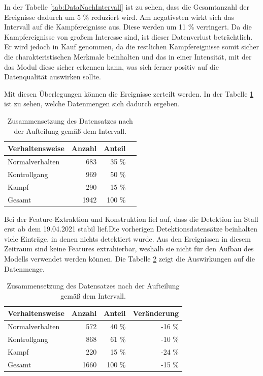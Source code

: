 In der Tabelle \ref{tab:DataNachIntervall} ist zu sehen, dass die Gesamtanzahl der Ereignisse dadurch um 5 \% reduziert wird. Am negativsten wirkt sich das Intervall auf die Kampfereignisse aus. Diese werden um 11 \% verringert. Da die Kampfereignisse von großem Interesse sind, ist dieser Datenverlust beträchtlich. Er wird jedoch in Kauf genommen, da die restlichen Kampfereignisse somit sicher die charakteristischen Merkmale beinhalten und das in einer Intensität, mit der das Modul diese sicher erkennen kann, was sich ferner positiv auf die Datenqualität auswirken sollte. \par

Mit diesen Überlegungen können die Ereignisse zerteilt werden. In der Tabelle \ref{tab:DatasetSplit} ist zu sehen, welche Datenmengen sich dadurch ergeben. 

\begin{table}[ht]
    \centering
    \caption{Zusammensetzung des Datensatzes nach der Aufteilung gemäß dem Intervall.}
    \begin{tabular}{|l|r|r|r|}
    \hline
        Verhaltensweise & Anzahl & Anteil \\
    \hline
        Normalverhalten & 683 & 35 \% \\
        Kontrollgang & 969 & 50 \% \\
        Kampf & 290 & 15 \% \\
    \hline
    \hline
        Gesamt & 1942 & 100 \%\\
    \hline
    \end{tabular}
    \label{tab:DatasetSplit}
\end{table}

Bei der Feature-Extraktion und Konstruktion fiel auf, dass die Detektion im Stall erst ab dem 19.04.2021 stabil lief.Die vorherigen Detektionsdatensätze beinhalten viele Einträge, in denen nichts detektiert wurde. Aus den Ereignissen in diesem Zeitraum sind keine Features extrahierbar, weshalb sie nicht für den Aufbau des Modells verwendet werden können. Die Tabelle \ref{tab:DatasetFeatExtr} zeigt die Auswirkungen auf die Datenmenge.

\begin{table}[ht]
    \centering
    \caption{Zusammensetzung des Datensatzes nach der Aufteilung gemäß dem Intervall.}
    \begin{tabular}{|l|r|r|r|}
    \hline
        Verhaltensweise & Anzahl & Anteil & Veränderung\\
    \hline
        Normalverhalten & 572 & 40 \% & -16 \%\\
        Kontrollgang & 868 & 61 \% & -10 \%\\
        Kampf & 220 & 15 \% & -24 \%\\
    \hline
    \hline
        Gesamt & 1660 & 100 \% & -15 \% \\
    \hline
    \end{tabular}
    \label{tab:DatasetFeatExtr}
\end{table}


